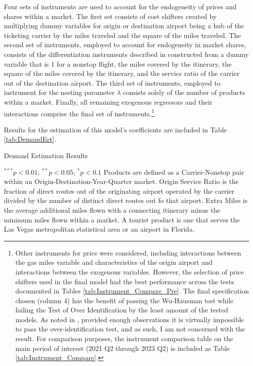 \documentclass{article}
\begin{document}
	 Four sets of instruments are used to account for the endogeneity of prices and shares within a market. The first set consists of cost shifters created by multiplying dummy variables for origin or destination airport being a hub of the ticketing carrier by the miles traveled and the square of the miles traveled. The second set of instruments, employed to account for endogeneity in market shares, consists of the differentiation instruments described in \citet{gandhi_measuring_2019} constructed from a dummy variable that is 1 for a nonstop flight, the miles covered by the itinerary, the square of the miles covered by the itinerary, and the service ratio of the carrier out of the destination airport. The third set of instruments, employed to instrument for the nesting parameter $\lambda$ consists solely of the number of products within a market. Finally, all remaining exogenous regressors and their interactions comprise the final set of instruments.\footnote{Other instruments for price were considered, including interactions between the gas miles variable and characteristics of the origin airport and interactions between the exogenous variables. However, the selection of price shifters used in the final model had the best performance across the tests documented in Tables \ref{tab:Instrument_Compare_Pre}. The final specification chosen (column 4) has the benefit of passing the Wu-Hausman test while failing the Test of Over Identification by the least amount of the tested models. As noted in \citet{nevo_measuring_2001}, provided enough observations it is virtually impossible to pass the over-identification test, and as such, I am not concerned with the result. For comparison purposes, the instrument comparison table on the main period of interest (2021 Q2 through 2023 Q2) is included as Table \ref{tab:Instrument_Compare}.}
	
    Results for the estimation of this model's coefficients are included in Table \ref{tab:DemandEst}.

    \begin{table}
        \caption{Demand Estimation Results}
        \label{tab:DemandEst}
        
        \footnotesize{$^{***}p<0.01$; $^{**}p<0.05$; $^{*}p<0.1$ Products are defined as a Carrier-Nonstop pair within an Origin-Destination-Year-Quarter market. Origin Service Ratio is the fraction of direct routes out of the originating airport operated by the carrier divided by the number of distinct direct routes out fo that airport. Extra Miles is the average additional miles flown with a connecting itinerary minus the minimum miles flown within a market.  A tourist product is one that serves the Las Vegas metropolitan statistical area or an airport in Florida.}
    \end{table}
	
\end{document}
